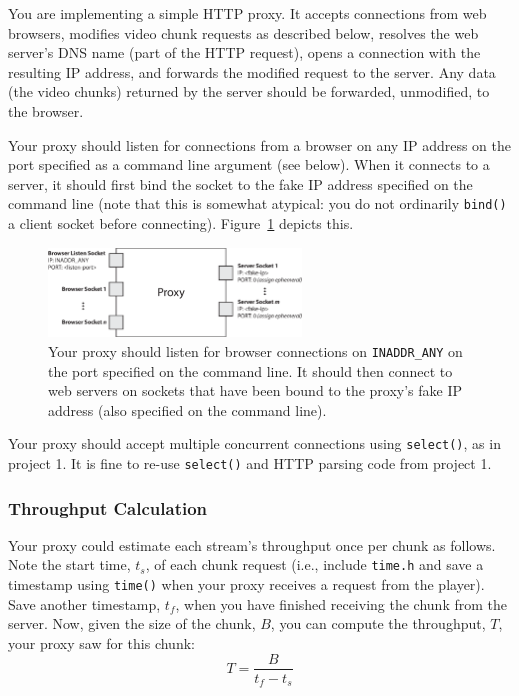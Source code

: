 \documentclass{article}
\begin{document}
You are implementing a simple HTTP proxy. It accepts connections from web
browsers, modifies video chunk requests as described below, resolves the web
server's DNS name (part of the HTTP request), opens a connection with the
resulting IP address, and forwards the modified request to the server. Any data
(the video chunks) returned by the server should be forwarded, unmodified, to
the browser.

Your proxy should listen for connections from a browser on any IP address on
the port specified as a command line argument (see below). When it connects to
a server, it should first bind the socket to the fake IP address specified on
the command line (note that this is somewhat atypical: you do not ordinarily
\texttt{bind()} a client socket before connecting). Figure~\ref{fig:proxy}
depicts this.

\begin{figure}
	\centering
	\includegraphics[width=0.6\textwidth]{figs/proxy.eps}
	\caption{Your proxy should listen for browser connections on
	\texttt{INADDR\_ANY} on the port specified on the command line. It should
	then connect to web servers on sockets that have been bound to the proxy's
	fake IP address (also specified on the command line).}

	\label{fig:proxy}
\end{figure}

Your proxy should accept multiple concurrent connections using
\texttt{select()}, as in project 1. It is fine to re-use \texttt{select()} and
HTTP parsing code from project 1.

\subsubsection{Throughput Calculation}
\label{sec:throughput-estimation}
Your proxy could estimate each stream's throughput once per chunk as
follows. Note the start time, $t_s$, of each chunk request (i.e., include
\texttt{time.h} and save a timestamp using \texttt{time()} when your proxy
receives a request from the player). Save another timestamp, $t_f$, when you
have finished receiving the chunk from the server.  Now, given the size of the
chunk, $B$, you can compute the throughput, $T$, your proxy saw for this
chunk:
\[
	T = \frac{B}{t_f - t_s}
\]
\end{document}
